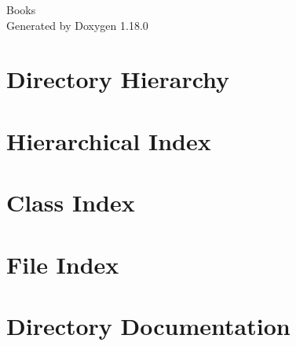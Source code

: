 \documentclass[twoside]{book}
\newcommand{\+}{\discretionary{\mbox{\scriptsize$\hookleftarrow$}}{}{}}
\newcommand{\clearemptydoublepage}{%
    \newpage{\pagestyle{empty}\cleardoublepage}%
  }
\begin{document}
  \raggedbottom
    \hypersetup{pageanchor=false,
                bookmarksnumbered=true,
                pdfencoding=unicode
               }
  \begin{titlepage}
  \vspace*{7cm}
  \begin{center}%
  {\Large Books}\\
  \vspace*{1cm}
  {\large Generated by Doxygen 1.18.0}\\
  \end{center}
  \end{titlepage}
  \clearemptydoublepage
  \tableofcontents
  \clearemptydoublepage
  \hypersetup{pageanchor=true}

\chapter{Directory Hierarchy}

\chapter{Hierarchical Index}

\chapter{Class Index}

\chapter{File Index}

\chapter{Directory Documentation}



\end{document}
